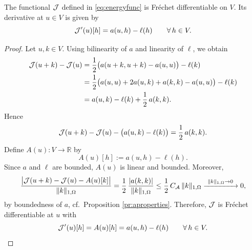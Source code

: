 \begin{lemma}\label{lem:Jdiff}
	The functional ${\mathcal J}$ defined in \eqref{eq:energyfunc} is Fréchet differentiable on $V$. Its derivative at $u\in V$ is given by
	\begin{equation}\label{eq:Jprime}
		{\mathcal J}'(u)[h] = a(u,h)-\ell(h)\qquad \forall\, h\in V.
	\end{equation}
\end{lemma}

\begin{proof}
	Let $u,k\in V$. Using bilinearity of $a$ and linearity of $\ell$, we obtain
	\begin{align*}
		{\mathcal J}(u+k)-{\mathcal J}(u)
		 & =\frac12\bigl(a(u+k,u+k)-a(u,u)\bigr)-\ell(k)            \\
		 & =\frac12\bigl(a(u,u)+2a(u,k)+a(k,k)-a(u,u)\bigr)-\ell(k) \\
		 & = a(u,k)-\ell(k)+\frac12\,a(k,k).
	\end{align*}
	Hence
	\begin{equation*}
		{\mathcal J}(u+k)-{\mathcal J}(u)-\bigl(a(u,k)-\ell(k)\bigr)
		=\frac12\,a(k,k).
	\end{equation*}
	Define $A(u):V\to\mathbb R$ by
	\begin{equation*}
		A(u)[h]:=a(u,h)-\ell(h).
	\end{equation*}
	Since $a$ and $\ell$ are bounded, $A(u)$ is linear and bounded. Moreover,
	\begin{equation*}
		\frac{\bigl|\cJ(u+k)-\cJ(u)-A(u)[k]\bigr|}{\|k\|_{1,\Omega}}
		=\frac{1}{2}\,\frac{|a(k,k)|}{\|k\|_{1,\Omega}}
		\le \frac12\,C_{\mathcal A}\,\|k\|_{1,\Omega}\xrightarrow{\ \|k\|_{1,\Omega}\to 0\ }0,
	\end{equation*}
	by boundedness of $a$, cf.\ Proposition \ref{pr:aproperties}. Therefore, ${\mathcal J}$ is Fréchet differentiable at $u$ with
	\begin{equation*}
		{\mathcal J}^\prime(u)[h]=A(u)[h]=a(u,h)-\ell(h)
		\qquad \forall\, h\in V.
	\end{equation*}
\end{proof}


